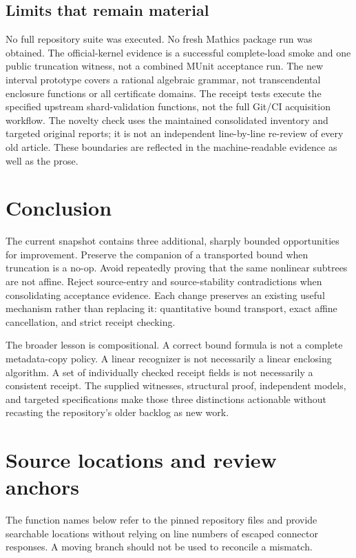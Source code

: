 \documentclass[11pt,letterpaper]{article}
\begin{document}
\subsection{Limits that remain material}

No full repository suite was executed. No fresh Mathics package run was obtained.
The official-kernel evidence is a successful complete-load smoke and one public
truncation witness, not a combined MUnit acceptance run. The new interval
prototype covers a rational algebraic grammar, not transcendental enclosure
functions or all certificate domains. The receipt tests execute the specified
upstream shard-validation functions, not the full Git/CI acquisition workflow.
The novelty check uses the maintained consolidated inventory and targeted
original reports; it is not an independent line-by-line re-review of every old
article. These boundaries are reflected in the machine-readable evidence as well
as the prose.

\section{Conclusion}

The current snapshot contains three additional, sharply bounded opportunities
for improvement. Preserve the companion of a transported bound when truncation
is a no-op. Avoid repeatedly proving that the same nonlinear subtrees are not
affine. Reject source-entry and source-stability contradictions when consolidating
acceptance evidence. Each change preserves an existing useful mechanism rather
than replacing it: quantitative bound transport, exact affine cancellation, and
strict receipt checking.

The broader lesson is compositional. A correct bound formula is not a complete
metadata-copy policy. A linear recognizer is not necessarily a linear enclosing
algorithm. A set of individually checked receipt fields is not necessarily a
consistent receipt. The supplied witnesses, structural proof, independent
models, and targeted specifications make those three distinctions actionable
without recasting the repository's older backlog as new work.

\appendix
\section{Source locations and review anchors}

The function names below refer to the pinned repository files and provide
searchable locations without relying on line numbers of escaped connector responses. A moving branch should not be used to reconcile a mismatch.
\end{document}
